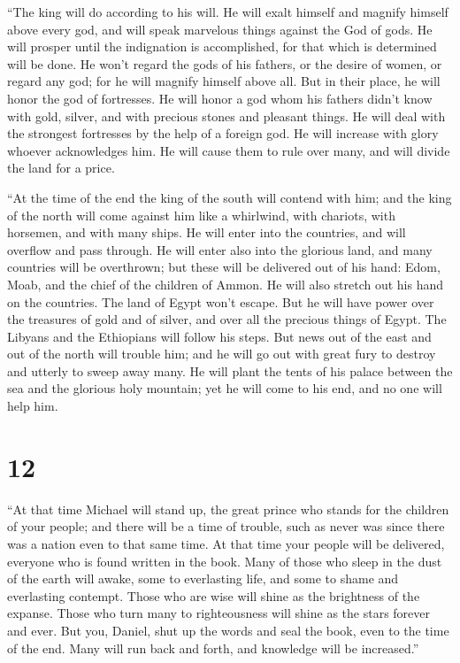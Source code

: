  ``The king will do according to his will. He will exalt
himself and magnify himself above every god, and will speak marvelous
things against the God of gods. He will prosper until the indignation is
accomplished, for that which is determined will be done. 
He won't regard the gods of his fathers, or the desire of women, or
regard any god; for he will magnify himself above all.  But
in their place, he will honor the god of fortresses. He will honor a god
whom his fathers didn't know with gold, silver, and with precious stones
and pleasant things.  He will deal with the strongest
fortresses by the help of a foreign god. He will increase with glory
whoever acknowledges him. He will cause them to rule over many, and will
divide the land for a price.

 ``At the time of the end the king of the south will
contend with him; and the king of the north will come against him like a
whirlwind, with chariots, with horsemen, and with many ships. He will
enter into the countries, and will overflow and pass through.
 He will enter also into the glorious land, and many
countries will be overthrown; but these will be delivered out of his
hand: Edom, Moab, and the chief of the children of Ammon. 
He will also stretch out his hand on the countries. The land of Egypt
won't escape.  But he will have power over the treasures of
gold and of silver, and over all the precious things of Egypt. The
Libyans and the Ethiopians will follow his steps.  But news
out of the east and out of the north will trouble him; and he will go
out with great fury to destroy and utterly to sweep away many.
 He will plant the tents of his palace between the sea and
the glorious holy mountain; yet he will come to his end, and no one will
help him.

\hypertarget{section-11}{%
\section{12}\label{section-11}}

 ``At that time Michael will stand up, the great prince who
stands for the children of your people; and there will be a time of
trouble, such as never was since there was a nation even to that same
time. At that time your people will be delivered, everyone who is found
written in the book.  Many of those who sleep in the dust of
the earth will awake, some to everlasting life, and some to shame and
everlasting contempt.  Those who are wise will shine as the
brightness of the expanse. Those who turn many to righteousness will
shine as the stars forever and ever.  But you, Daniel, shut
up the words and seal the book, even to the time of the end. Many will
run back and forth, and knowledge will be increased.''

